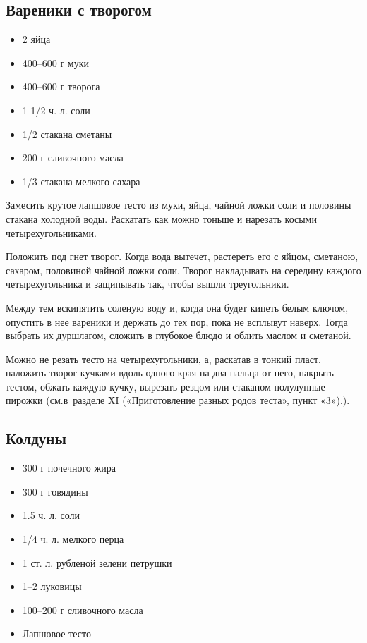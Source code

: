\subsection{Вареники с творогом}\label{sec:rec19}

\begin{itemize}
	\item 2 яйца
    \item 400–600 г муки
    \item 400–600 г творога
    \item 1 1/2 ч. л. соли
    \item 1/2 стакана сметаны
    \item 200 г сливочного масла 
    \item 1/3 стакана мелкого сахара
\end{itemize}

Замесить крутое лапшовое тесто из муки, яйца, чайной ложки соли и половины стакана холодной воды. Раскатать как можно тоньше и нарезать косыми четырехугольниками.

Положить под гнет творог. Когда вода вытечет, растереть его с яйцом, сметаною, сахаром, половиной чайной ложки соли. Творог накладывать на середину каждого четырехугольника и защипывать так, чтобы вышли треугольники.

Между тем вскипятить соленую воду и, когда она будет кипеть белым ключом, опустить в нее вареники и держать до тех пор, пока не всплывут наверх. Тогда выбрать их дуршлагом, сложить в глубокое блюдо и облить маслом и сметаной.

Можно не резать тесто на четырехугольники, а, раскатав в тонкий пласт, наложить творог кучками вдоль одного края на два пальца от него, накрыть тестом, обжать каждую кучку, вырезать резцом или стаканом полулунные пирожки (см.в~\hyperref[sub:slojonoje]{разделе XI («Приготовление разных родов теста», пункт «3»)}.).

\subsection{Колдуны}

\begin{itemize}
	\item 300 г почечного жира
    \item 300 г говядины 
    \item 1.5 ч. л. соли
    \item 1/4 ч. л. мелкого перца 
    \item 1 ст. л. рубленой зелени петрушки
    \item 1–2 луковицы
    \item 100–200 г сливочного масла 
    \item Лапшовое тесто
\end{itemize}


